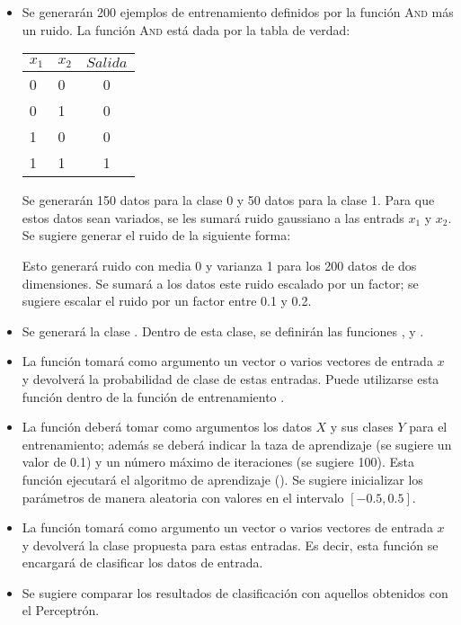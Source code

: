 \begin{itemize}
    \item Se generarán 200 ejemplos de entrenamiento definidos por la función \textsc{And} más un ruido. La función \textsc{And} está dada por la tabla de verdad:
    \begin{center}
        \begin{tabular}{ l l | c }
          $x_1$ & $x_2$ & $Salida$\\ \hline
          0 & 0  & 0 \\ \hline
          0 & 1 &  0  \\ \hline
          1 & 0 & 0  \\ \hline
          1 & 1 & 1  \\
        \end{tabular}
    \end{center}
    Se generarán 150 datos para la clase 0 y 50 datos para la clase 1. Para que estos datos sean variados, se les sumará ruido gaussiano a las entrads $x_1$ y $x_2$. Se sugiere generar el ruido de la siguiente forma:
    \begin{center}
    \end{center}
    Esto generará ruido con media 0 y varianza 1 para los 200 datos de dos dimensiones. Se sumará a los datos este ruido escalado por un factor; se sugiere escalar el ruido por un factor entre 0.1 y 0.2.

    \item Se generará la clase . Dentro de esta clase, se definirán las funciones ,  y .

    \item La función  tomará como argumento un vector o varios vectores de entrada $x$ y devolverá la probabilidad de clase de estas entradas. Puede utilizarse esta función dentro de la función de entrenamiento .

    \item La función  deberá tomar como argumentos los datos $X$ y sus clases $Y$ para el entrenamiento; además se deberá indicar la taza de aprendizaje (se sugiere un valor de 0.1) y un número máximo de iteraciones (se sugiere 100). Esta función ejecutará el algoritmo de aprendizaje (). Se sugiere inicializar los parámetros de manera aleatoria con valores en el intervalo $[-0.5,0.5]$.

    \item La función  tomará como argumento un vector o varios vectores de entrada $x$ y devolverá la clase propuesta para estas entradas. Es decir, esta función se encargará de clasificar los datos de entrada.

    \item Se sugiere comparar los resultados de clasificación con aquellos obtenidos con el Perceptrón. 
\end{itemize}


